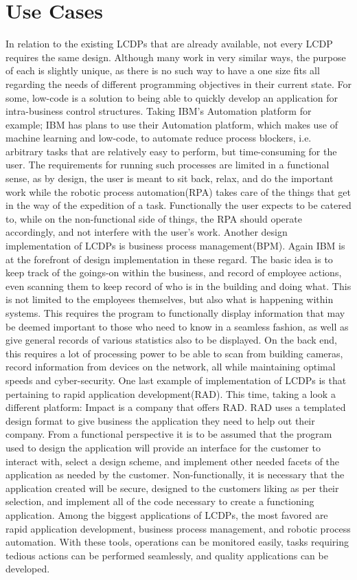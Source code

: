 \documentclass[conference]{IEEEtran}
\begin{document}
\section{Use Cases}
In relation to the existing LCDPs that are already available, not every LCDP requires the same design.  Although many work in very similar ways, the purpose of each is slightly unique, as there is no such way to have a one size fits all regarding the needs of different programming objectives in their current state.  For some, low-code is a solution to being able to quickly develop an application for intra-business control structures.  Taking IBM's Automation platform for example; IBM has plans to use their Automation platform, which makes use of machine learning and low-code, to automate reduce process blockers, i.e. arbitrary tasks that are relatively easy to perform, but time-consuming for the user.  The requirements for running such processes are limited in a functional sense, as by design, the user is meant to sit back, relax, and do the important work while the robotic process automation(RPA)\cite{LCP} takes care of the things that get in the way of the expedition of a task.  Functionally the user expects to be catered to, while on the non-functional side of things, the RPA should operate accordingly, and not interfere with the user's work\cite{RPA}.  Another design implementation of LCDPs is business process management(BPM)\cite{LCP}.  Again IBM is at the forefront of design implementation in these regard.  The basic idea is to keep track of the goings-on within the business, and record of employee actions, even scanning them to keep record of who is in the building and doing what.  This is not limited to the employees themselves, but also what is happening within systems.  This requires the program to functionally display information that may be deemed important to those who need to know in a seamless fashion, as well as give general records of various statistics also to be displayed.  On the back end, this requires a lot of processing power to be able to scan from building cameras, record information from devices on the network, all while maintaining optimal speeds and cyber-security\cite{BPM}.  One last example of implementation of LCDPs is that pertaining to rapid application development(RAD)\cite{LCP}.  This time, taking a look a different platform: Impact is a company that offers RAD.  RAD uses a templated design format to give business the application they need to help out their company.  From a functional perspective it is to be assumed that the program used to design the application will provide an interface for the customer to interact with, select a design scheme, and implement other needed facets of the application as needed by the customer.  Non-functionally, it is necessary that the application created will be secure, designed to the customers liking as per their selection, and implement all of the code necessary to create a functioning application.  Among the biggest applications of LCDPs, the most favored are rapid application development, business process management, and robotic process automation.  With these tools, operations can be monitored easily, tasks requiring tedious actions can be performed seamlessly, and quality applications can be developed.
\end{document}
